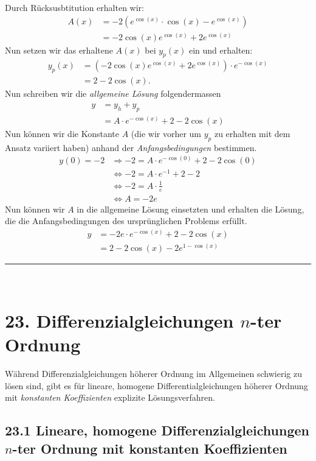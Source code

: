 \documentclass[a4paper,landscape,8pt]{extarticle}
\newcommand{\sep}{\vspace{5pt}\noindent\hrule\vspace{5pt}}
\renewcommand*{\newpage}{ \ }
\begin{document}
\begin{multicols*}{4}
\begin{warmup}
Durch Rücksusbtitution erhalten wir:
\begin{align*}
A(x) &= -2(e^{\cos(x)}\cdot \cos(x) - e^{\cos(x)})\\
&= -2\cos(x)e^{\cos(x)} +2e^{\cos(x)}
\end{align*}
Nun setzen wir das erhaltene $A(x)$ bei $y_p(x)$ ein und erhalten:
\begin{align*}
y_p(x) &= \left(-2\cos(x)e^{\cos(x)} +2e^{\cos(x)}\right)\cdot e^{-\cos(x)}\\
&= 2-2\cos(x).
\end{align*}
Nun schreiben wir die \emph{allgemeine Lösung} folgendermassen
\begin{align*}
y &= y_h + y_p\\
&= A \cdot e^{-\cos(x)} + 2-2\cos(x)
\end{align*}
Nun können wir die Konstante $A$ (die wir vorher um $y_p$ zu erhalten mit dem
Ansatz variiert haben) anhand der \emph{Anfangsbedingungen} bestimmen.
\begin{align*}
y(0) = -2 &\Longrightarrow -2 = A \cdot e^{-\cos(0)} + 2-2\cos(0)\\
&\Longleftrightarrow -2 = A\cdot{e^{-1}} + 2 - 2\\
&\Longleftrightarrow -2 = A\cdot\frac{1}{e}\\
&\Longleftrightarrow A = -2 e
\end{align*}
Nun können wir $A$ in die allgemeine Lösung einsetzten und erhalten die Lösung,
die die Anfangsbedingungen des ursprünglichen Problems erfüllt. 
\begin{align*}
y &= -2e \cdot e^{-\cos(x)} + 2-2\cos(x)\\
&= 2 - 2\cos(x) -2e^{1-\cos(x)}
\end{align*}

\sep
\end{warmup}

\newpage

\section{23. Differenzialgleichungen $n$-ter Ordnung}

Während Differenzialgleichungen höherer Ordnung im Allgemeinen schwierig zu
lösen sind, gibt es für lineare, homogene Differentialgleichungen höherer
Ordnung mit \emph{konstanten Koeffizienten} explizite Lösungsverfahren.

\subsection{23.1 Lineare, homogene Differenzialgleichungen $n$-ter Ordnung mit
konstanten Koeffizienten}


\end{multicols*}
\end{document}
